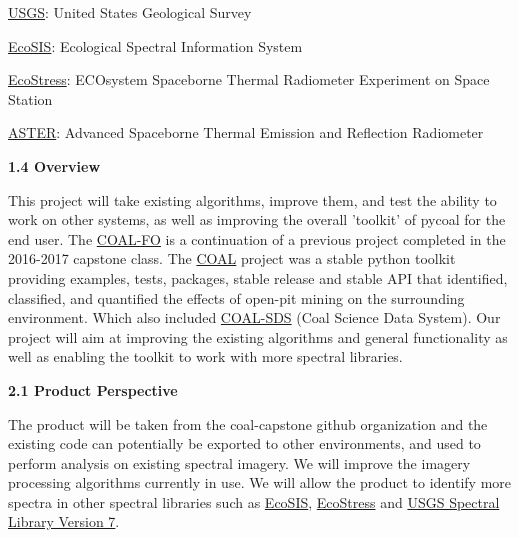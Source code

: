 \documentclass[a4paper,12pt]{article}
\begin{document}
\noindent \href{https://www.usgs.gov/}{USGS}: United States Geological Survey \newline

\noindent \href{https://ecosis.org/}{EcoSIS}: Ecological Spectral Information System \newline

\noindent \href{https://ecostress.jpl.nasa.gov/}{EcoStress}: ECOsystem Spaceborne Thermal Radiometer Experiment on Space Station \newline

\noindent \href{https://asterweb.jpl.nasa.gov/index.asp}{ASTER}: Advanced Spaceborne Thermal Emission and Reflection Radiometer \newline



\noindent \textbf{1.4 Overview}\newline


\noindent This project will take existing algorithms, improve them, and test the ability to work on other systems, as well as improving the overall 'toolkit' of pycoal for the end user. The \href{https://capstone-coal.github.io/team}{COAL-FO} is a continuation of a previous project completed in the 2016-2017 capstone class. The \href{https://capstone-coal.github.io/}{COAL} project was a stable python toolkit providing examples, tests, packages, stable release and stable API that identified, classified, and quantified the effects of open-pit mining on the surrounding environment. Which also included \href{https://github.com/capstone-coal/coal-sds}{COAL-SDS} (Coal Science Data System). Our project will aim at improving the existing algorithms and general functionality as well as enabling the toolkit to work with more spectral libraries. \newline


\newline


\noindent \textbf{2.1 Product Perspective}\newline


\noindent The product will be taken from the coal-capstone github organization and the existing code can potentially be exported to other environments, and used to perform analysis on existing spectral imagery. We will improve the imagery processing algorithms currently in use. We will allow the product to identify more spectra in other spectral libraries such as \href{https://ecosis.org/}{EcoSIS}, \href{https://speclib.jpl.nasa.gov/}{EcoStress} and \href{https://speclab.cr.usgs.gov/spectral-lib.html}{USGS Spectral Library Version 7}.\newline
\end{document}
